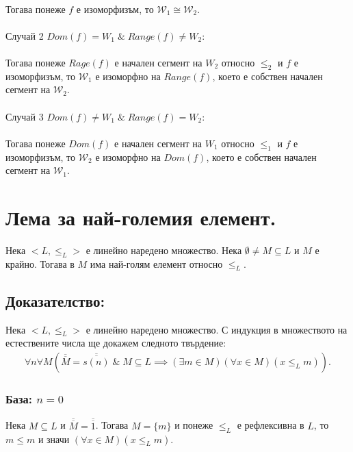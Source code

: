 \documentclass[12pt]{article}
\begin{document}
\\
Тогава понеже \(f\) е изоморфизъм, то \(\mathcal{W}_1 \cong \mathcal{W}_2\).
\\
\vspace{1mm}
\\
Случай 2 \(Dom(f) = W_1 \; \& \; Range(f) \neq W_2\):
\\
\vspace{1mm}
\\
Тогава понеже \(Rage(f)\) е начален сегмент на \(W_2\) относно \(\leq_2\)
и \(f\) е изоморфизъм, то \(\mathcal{W}_1\) е изоморфно на \(Range(f)\),
което е собствен начален сегмент на \(\mathcal{W}_2\). 
\\
\vspace{1mm}
\\
Случай 3 \(Dom(f) \neq W_1 \; \& \; Range(f) = W_2\):
\\
\vspace{1mm}
\\
Тогава понеже \(Dom(f)\) е начален сегмент на \(W_1\) относно \(\leq_1\)
и \(f\) е изоморфизъм, то \(\mathcal{W}_2\) е изоморфно на \(Dom(f)\),
което е собствен начален сегмент на \(\mathcal{W}_1\).

\section*{Лема за най-големия елемент.}
Нека \(<L, \leq_L>\) е линейно наредено множество.
Нека \(\emptyset \neq M \subseteq L\) и \(M\) е крайно.
Тогава в \(M\) има най-голям елемент относно \(\leq_L\).

\subsection*{Доказателство:}
Нека \(<L, \leq_L>\) е линейно наредено множество.
С индукция в множеството на естествените числа ще докажем
следното твърдение:
\begin{align*}
\forall n \forall M (\overline{\overline{M}} = \overline{\overline{s(n)}} \; \& \; M \subseteq L \implies (\exists m \in M)(\forall x \in M)(x \leq_L m)).
\end{align*}

\subsubsection*{База: \(n = 0\)}
Нека \(M \subseteq L\) и \(\overline{\overline{M}} = \overline{\overline{1}}\).
Тогава \(M = \{m\}\) и понеже \(\leq_L\) е рефлексивна в \(L\), то
\(m \leq m\) и значи \((\forall x \in M)(x \leq_L m)\).
\end{document}
